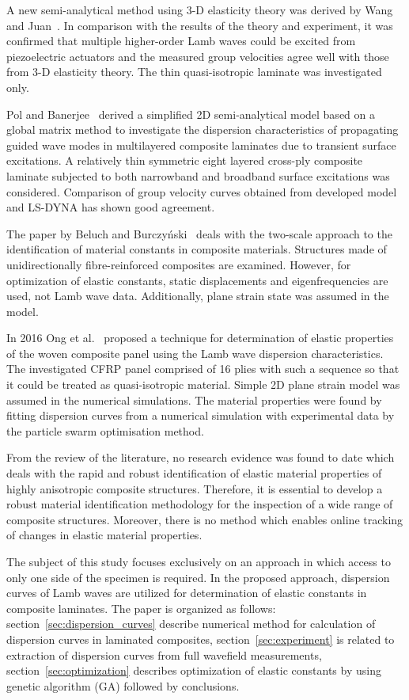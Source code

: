 \documentclass[preprint,12pt]{elsarticle}
\begin{document}
	A new semi-analytical method using 3-D elasticity theory was derived by Wang and Juan~\cite{Wang2007}. In comparison with the results of the theory and experiment, it was confirmed that multiple higher-order Lamb waves could be excited from piezoelectric actuators and the measured group velocities agree well with those from 3-D elasticity theory. The thin quasi-isotropic laminate was investigated only.
	
	Pol and Banerjee~\cite{Pol2013} derived a simplified 2D semi-analytical model based on a global matrix method to investigate the dispersion characteristics of propagating guided wave modes in multilayered composite laminates due to transient surface excitations. A relatively thin symmetric eight layered cross-ply composite laminate subjected to both narrowband and broadband surface excitations was considered. Comparison of group velocity curves obtained from developed model and LS-DYNA has shown good agreement.
	
	The paper by Beluch and Burczyński~\cite{Beluch2014} deals with the two-scale approach to the identification of material constants in composite materials. Structures made of unidirectionally fibre-reinforced composites are examined. However, for optimization of elastic constants, static displacements and eigenfrequencies are used, not Lamb wave data. Additionally, plane strain state was assumed in the model.
	
	In 2016 Ong et al.~\cite{Ong2016} proposed a technique for determination of elastic properties of the woven composite panel using the Lamb wave dispersion characteristics. The investigated CFRP panel comprised of 16 plies with such a sequence so that it could be treated as quasi-isotropic material. Simple 2D plane strain model was assumed in the numerical simulations. The material properties were found by fitting dispersion curves from a numerical simulation with experimental data by the particle swarm optimisation method. 
	
	From the review of the literature, no research evidence was found to date which deals with the rapid and robust identification of elastic material properties of highly anisotropic composite structures. Therefore, it is essential to develop a robust material identification methodology for the inspection of a wide range of composite structures. Moreover, there is no method which enables online tracking of changes in elastic material properties.
	
	The subject of this study focuses exclusively on an approach in which access to only one side of the specimen is required. In the proposed approach, dispersion curves of Lamb waves are utilized for determination of elastic constants in composite laminates. The paper is organized as follows: section~\ref{sec:dispersion_curves} describe numerical method for calculation of dispersion curves in laminated composites, section~\ref{sec:experiment} is related to extraction of dispersion curves from full wavefield measurements, section~\ref{sec:optimization} describes optimization of elastic constants by using genetic algorithm (GA) followed by conclusions.
	
\end{document}

